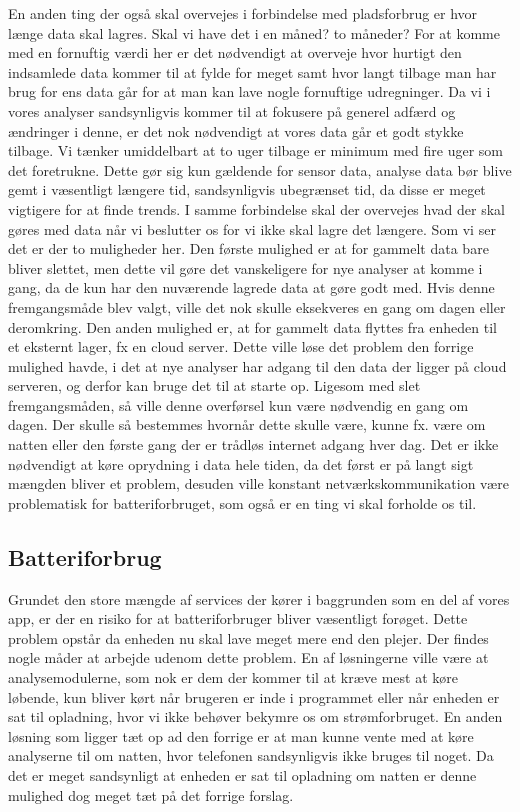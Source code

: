 En anden ting der også skal overvejes i forbindelse med pladsforbrug er hvor længe data skal lagres.
Skal vi have det i en måned? to måneder?
For at komme med en fornuftig værdi her er det nødvendigt at overveje hvor hurtigt den indsamlede data kommer til at fylde for meget samt hvor langt tilbage man har brug for ens data går for at man kan lave nogle fornuftige udregninger.
Da vi i vores analyser sandsynligvis kommer til at fokusere på generel adfærd og ændringer i denne, er det nok nødvendigt at vores data går et godt stykke tilbage.
Vi tænker umiddelbart at to uger tilbage er minimum med fire uger som det foretrukne.
Dette gør sig kun gældende for sensor data, analyse data bør blive gemt i væsentligt længere tid, sandsynligvis ubegrænset tid, da disse er meget vigtigere for at finde trends.
I samme forbindelse skal der overvejes hvad der skal gøres med data når vi beslutter os for vi ikke skal lagre det længere.
Som vi ser det er der to muligheder her.
Den første mulighed er at for gammelt data bare bliver slettet, men dette vil gøre det vanskeligere for nye analyser at komme i gang, da de kun har den nuværende lagrede data at gøre godt med.
Hvis denne fremgangsmåde blev valgt, ville det nok skulle eksekveres en gang om dagen eller deromkring.
Den anden mulighed er, at for gammelt data flyttes fra enheden til et eksternt lager, fx en cloud server.
Dette ville løse det problem den forrige mulighed havde, i det at nye analyser har adgang til den data der ligger på cloud serveren, og derfor kan bruge det til at starte op.
Ligesom med slet fremgangsmåden, så ville denne overførsel kun være nødvendig en gang om dagen.
Der skulle så bestemmes hvornår dette skulle være, kunne fx. være om natten eller den første gang der er trådløs internet adgang hver dag.
Det er ikke nødvendigt at køre oprydning i data hele tiden, da det først er på langt sigt mængden bliver et problem, desuden ville konstant netværkskommunikation være problematisk for batteriforbruget, som også er en ting vi skal forholde os til.

\subsection{Batteriforbrug}
Grundet den store mængde af services der kører i baggrunden som en del af vores app, er der en risiko for at batteriforbruger bliver væsentligt forøget.
Dette problem opstår da enheden nu skal lave meget mere end den plejer.
Der findes nogle måder at arbejde udenom dette problem.
En af løsningerne ville være at analysemodulerne, som nok er dem der kommer til at kræve mest at køre løbende, kun bliver kørt når brugeren er inde i programmet eller når enheden er sat til opladning, hvor vi ikke behøver bekymre os om strømforbruget.
En anden løsning som ligger tæt op ad den forrige er at man kunne vente med at køre analyserne til om natten, hvor telefonen sandsynligvis ikke bruges til noget.
Da det er meget sandsynligt at enheden er sat til opladning om natten er denne mulighed dog meget tæt på det forrige forslag.

